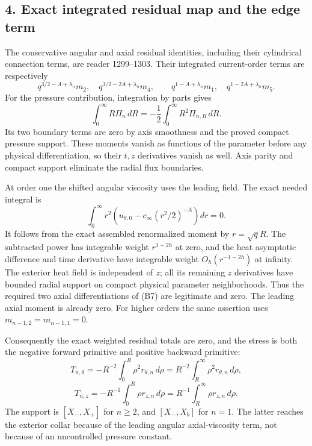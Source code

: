 \documentclass[10pt,a4paper]{article}
\begin{document}
\subsection{4. Exact integrated residual map and the edge term}\label{gclosure:exact-integrated-residual-map-and-the-edge-term}

The conservative angular and axial residual identities, including their cylindrical connection terms, are reader 1299--1303. Their integrated current-order terms are respectively \[
q^{3/2-A+\lambda_n}m_2,\quad q^{3/2-2A+\lambda_n}m_4,
\qquad
q^{1-A+\lambda_n}m_1,\quad q^{1-2A+\lambda_n}m_5.
\] For the pressure contribution, integration by parts gives \[
\int_0^\infty R\Pi_n\,dR=-\frac12\int_0^\infty R^2\Pi_{n,R}\,dR.
\] Its two boundary terms are zero by axis smoothness and the proved compact pressure support. These moments vanish as functions of the parameter before any physical differentiation, so their \(t,z\) derivatives vanish as well. Axis parity and compact support eliminate the radial flux boundaries.

At order one the shifted angular viscosity uses the leading field. The exact needed integral is \[
\int_0^\infty r^2\left(u_{\theta,0}-c_\infty(r^2/2)^{-A}\right)dr=0.
\tag{B7}
\] It follows from the exact assembled renormalized moment by \(r=\sqrt qR\). The subtracted power has integrable weight \(r^{1-2h}\) at zero, and the heat asymptotic difference and time derivative have integrable weight \(O_h(r^{-1-2h})\) at infinity. The exterior heat field is independent of \(z\); all its remaining \(z\) derivatives have bounded radial support on compact physical parameter neighborhoods. Thus the required two axial differentiations of (B7) are legitimate and zero. The leading axial moment is already zero. For higher orders the same assertion uses \(m_{n-1,2}=m_{n-1,1}=0\).

Consequently the exact weighted residual totals are zero, and the stress is both the negative forward primitive and positive backward primitive: \[
T_{n,\theta}=-R^{-2}\int_0^R\rho^2r_{\theta,n}\,d\rho
=R^{-2}\int_R^\infty\rho^2r_{\theta,n}\,d\rho,
\] \[
T_{n,z}=-R^{-1}\int_0^R\rho r_{z,n}\,d\rho
=R^{-1}\int_R^\infty\rho r_{z,n}\,d\rho.
\] The support is \([X_-,X_+]\) for \(n\ge2\), and \([X_-,X_b]\) for \(n=1\). The latter reaches the exterior collar because of the leading angular axial-viscosity term, not because of an uncontrolled pressure constant.
\end{document}
